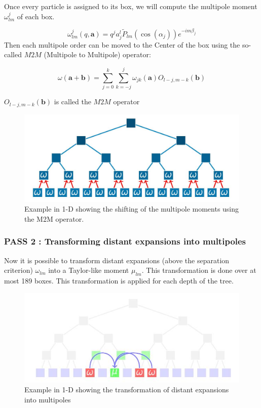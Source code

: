 \documentclass[10pt,twoside,a4paper]{report}
\begin{document}
    Once every particle is assigned to its box, we will compute the multipole moment $\omega_{lm}^j$ of each box.
    
    \begin{equation}
    \omega_{lm}^{j}(q,\textbf{a}) = q^j a_j^l \widetilde{P}_{lm}(\cos(\alpha_j))e^{-im\beta_j}
    \end{equation}
%
Then each multipole order can be moved to the Center of the box using the so-called $M2M$ (Multipole to Multipole) operator:    
    
    \begin{equation}
    \omega(\textbf{a} + \textbf{b}) = \sum\limits_{j=0}^{k} \sum\limits_{k=-j}^{j} \omega_{jk}(\textbf{a}) O_{l-j,m-k}(\textbf{b})
    \end{equation}

   $O_{l-j,m-k}(\textbf{b})$ is called the $M2M$ operator
   
   \begin{figure}[H]
   \includegraphics[scale=0.4]{ShiftMultipole}
    \centering 
    \caption{Example in 1-D showing the shifting of the multipole moments using the M2M operator. }
    \label{fig:multipole}
   \end{figure}
   
   
   	\subsubsection{PASS 2 : Transforming distant expansions into multipoles}
   	
   	Now it is possible to transform distant expansions (above the separation criterion) $\omega_{lm}$ into a Taylor-like moment $\mu_{lm}$. This transformation is done over at most 189 boxes. This transformation is applied for each depth of the tree.  
   	
   	
 \begin{figure}[H]
 	\label{fig:M2L}
   \includegraphics[scale=0.8]{transformExpansions1}
    \centering 
    \caption{Example in 1-D showing the transformation of distant expansions into multipoles}
    
   \end{figure}
   
\end{document}
